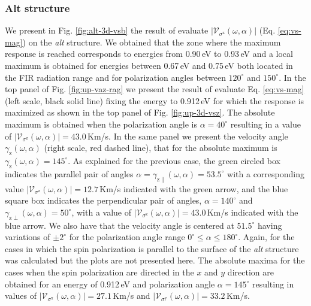 \documentclass[prb,11pt,tightenlines,twocolumn,aps]{revtex4-1}
\begin{document}

\subsubsection{Alt structure}

We present in Fig. \ref{fig:alt-3d-vsb} the result of evaluate
$|\mathcal{V}_{\sigma^{\mathrm{z}}} (\omega,\alpha)|$ (Eq. \eqref{eq:vs-mag})
on the \emph{alt} structure.
% 
We obtained that the zone where the maximum response is reached corresponds to
energies from 0.90\,eV to 0.93\,eV and a local maximum is obtained
for energies between 0.67\,eV and 0.75\,eV both located in the FIR radiation
range and for polarization angles between $120^{\circ}$ and $150^{\circ}$.
In the top panel of Fig. \ref{fig:up-vaz-rag} we present the result of evaluate
Eq. \eqref{eq:vs-mag} (left scale, black solid line) fixing the energy to
0.912\,eV for which the response is maximized as shown in the
top panel of Fig. \ref{fig:up-3d-vsz}. The absolute maximum is obtained when
the polarization angle is $\alpha = 40^{\circ}$ resulting in a value of
$|\mathcal{V}_{\sigma^{\mathrm{z}}} (\omega,\alpha)| = 43.0$\,Km/s.
% 
In the same panel we present the velocity angle
$\gamma_{\mathrm{z}}(\omega,\alpha)$ (right scale, red dashed line), that for
the absolute maximum is $\gamma_{\mathrm{z}}(\omega,\alpha) = 145^{\circ}$.
% 
As explained for the previous case, the green circled box indicates the
parallel pair of angles $\alpha = \gamma_{\mathrm{z}\parallel}(\omega,\alpha) =
53.5^{\circ}$ with a corresponding value
$|\mathcal{V}_{\sigma^{\mathrm{z}}}(\omega,\alpha)| = 12.7$\,Km/s indicated
with the green arrow, and the blue square box indicates the perpendicular pair
of angles, $\alpha=140^{\circ}$ and
$\gamma_{\mathrm{z}\perp}(\omega,\alpha)=50^{\circ}$, with a value of
$|\mathcal{V}_{\sigma^{\mathrm{z}}} (\omega,\alpha)|=43.0$\,Km/s indicated with
the blue arrow.
% 
We also have that the velocity angle is centered at $51.5^{\circ}$ having
variations of $\pm 2^{\circ}$ for the polarization angle range $0^{\circ} \leq
\alpha \leq 180^{\circ}$.
% 
Again, for the cases in which the spin polarization is parallel to the surface
of the \emph{alt} structure was calculated but the plots are not presented
here. The absolute maxima for the cases when the spin polarization are directed
in the $x$ and $y$ direction are obtained for an energy of 0.912\,eV and
polarization angle $\alpha=145^{\circ}$ resulting in values of
$|\mathcal{V}_{\sigma^{\mathrm{x}}}(\omega,\alpha)| = 27.1$\,Km/s and
$|\mathcal{V}_{\sigma^{\mathrm{y}}}(\omega,\alpha)| = 33.2$\,Km/s.
\end{document}
